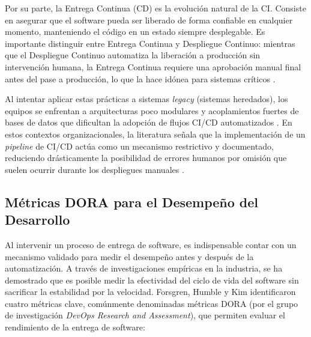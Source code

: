 Por su parte, la Entrega Continua (CD) es la evolución natural de la CI. Consiste en asegurar que el 
software pueda ser liberado de forma confiable en cualquier momento, manteniendo el código en un 
estado siempre desplegable. Es importante distinguir entre Entrega Continua y Despliegue Continuo: 
mientras que el Despliegue Continuo automatiza la liberación a producción sin intervención humana, 
la Entrega Continua requiere una aprobación manual final antes del pase a producción, lo que la hace 
idónea para sistemas críticos \cite{Proulx2018}.

Al intentar aplicar estas prácticas a sistemas \emph{legacy} (sistemas heredados), los equipos se 
enfrentan a arquitecturas poco modulares y acoplamientos fuertes de bases de datos que dificultan la 
adopción de flujos CI/CD automatizados \cite{Laukkanen2017, Shahin2017}. En estos contextos 
organizacionales, la literatura señala que la implementación de un \emph{pipeline} de CI/CD actúa 
como un mecanismo restrictivo y documentado, reduciendo drásticamente la posibilidad de errores 
humanos por omisión que suelen ocurrir durante los despliegues manuales \cite{Forsgren2018}.

\subsection{Métricas DORA para el Desempeño del Desarrollo}
Al intervenir un proceso de entrega de software, es indispensable contar con un mecanismo validado para 
medir el desempeño antes y después de la automatización. A través de investigaciones empíricas en la 
industria, se ha demostrado que es posible medir la efectividad del ciclo de vida del software sin 
sacrificar la estabilidad por la velocidad. Forsgren, Humble y Kim \cite{Forsgren2018} identificaron 
cuatro métricas clave, comúnmente denominadas métricas DORA (por el grupo de investigación 
\emph{DevOps Research and Assessment}), que permiten evaluar el rendimiento de la entrega de software:

